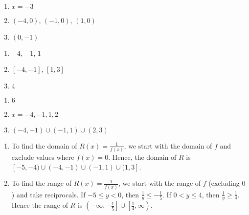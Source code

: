 \begin{multicols}{3}
\begin{enumerate}
\setcounter{enumi}{\value{HW}}

\item  $x=-3$
\item $(-4,0)$, $(-1,0)$, $(1,0)$
\item  $(0,-1)$

\setcounter{HW}{\value{enumi}}
\end{enumerate}
\end{multicols}

\begin{multicols}{3}
\begin{enumerate}
\setcounter{enumi}{\value{HW}}

\item  $-4$, $-1$, $1$
\item  $[-4,-1]$, $[1,3]$
\item  $4$

\setcounter{HW}{\value{enumi}}
\end{enumerate}
\end{multicols}


\begin{multicols}{3}
\begin{enumerate}
\setcounter{enumi}{\value{HW}}

\item  $6$
\item  $x=-4, -1,1,2$
\item  $(-4,-1) \cup (-1,1) \cup (2,3)$ 

\setcounter{HW}{\value{enumi}}
\end{enumerate}
\end{multicols}

\begin{enumerate}
\setcounter{enumi}{\value{HW}}

\item To find the domain of $R(x) = \frac{1}{f(x)}$, we start with the domain of $f$ and exclude values where $f(x) = 0$.  Hence, the domain of $R$ is $[-5,-4) \cup (-4,-1) \cup (-1,1) \cup (1,3]$.

\item  To find the range of $R(x) = \frac{1}{f(x)}$, we start with the range of $f$ (excluding $0$)  and take reciprocals.  If $-5 \leq y < 0$, then $\frac{1}{y} \leq -\frac{1}{5}$.  If $0 < y \leq 4$, then $\frac{1}{y} \geq \frac{1}{4}$. Hence the range of $R$ is $\left(-\infty, -\frac{1}{5} \right] \cup \left[ \frac{1}{4}, \infty \right)$. 

\setcounter{HW}{\value{enumi}}
\end{enumerate}


